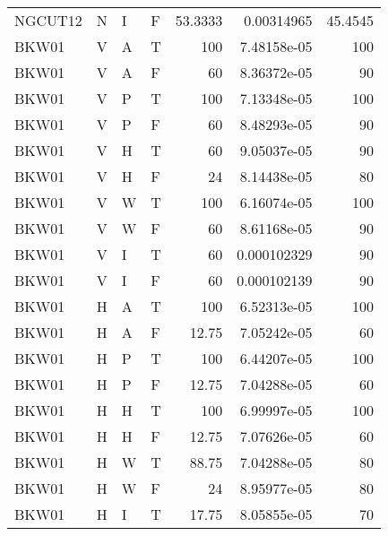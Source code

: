 \begin{longtable}{llllrrr}
    NGCUT12  & N         & I         & F          & 53.3333    & 0.00314965  & 45.4545  \\
    BKW01    & V         & A         & T          & 100        & 7.48158e-05 & 100      \\
    BKW01    & V         & A         & F          & 60         & 8.36372e-05 & 90       \\
    BKW01    & V         & P         & T          & 100        & 7.13348e-05 & 100      \\
    BKW01    & V         & P         & F          & 60         & 8.48293e-05 & 90       \\
    BKW01    & V         & H         & T          & 60         & 9.05037e-05 & 90       \\
    BKW01    & V         & H         & F          & 24         & 8.14438e-05 & 80       \\
    BKW01    & V         & W         & T          & 100        & 6.16074e-05 & 100      \\
    BKW01    & V         & W         & F          & 60         & 8.61168e-05 & 90       \\
    BKW01    & V         & I         & T          & 60         & 0.000102329 & 90       \\
    BKW01    & V         & I         & F          & 60         & 0.000102139 & 90       \\
    BKW01    & H         & A         & T          & 100        & 6.52313e-05 & 100      \\
    BKW01    & H         & A         & F          & 12.75      & 7.05242e-05 & 60       \\
    BKW01    & H         & P         & T          & 100        & 6.44207e-05 & 100      \\
    BKW01    & H         & P         & F          & 12.75      & 7.04288e-05 & 60       \\
    BKW01    & H         & H         & T          & 100        & 6.99997e-05 & 100      \\
    BKW01    & H         & H         & F          & 12.75      & 7.07626e-05 & 60       \\
    BKW01    & H         & W         & T          & 88.75      & 7.04288e-05 & 80       \\
    BKW01    & H         & W         & F          & 24         & 8.95977e-05 & 80       \\
    BKW01    & H         & I         & T          & 17.75      & 8.05855e-05 & 70       \\

\end{longtable}
